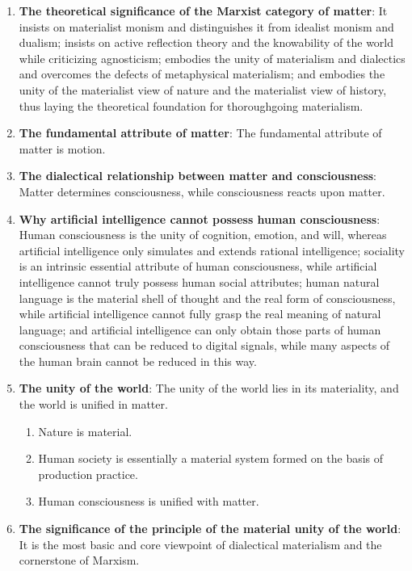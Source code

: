 \documentclass[12pt,a4paper]{ctexart}
\begin{document}
\begin{enumerate}[leftmargin=2em]
    \item \textbf{The theoretical significance of the Marxist category of matter}: It insists on materialist monism and distinguishes it from idealist monism and dualism; insists on active reflection theory and the knowability of the world while criticizing agnosticism; embodies the unity of materialism and dialectics and overcomes the defects of metaphysical materialism; and embodies the unity of the materialist view of nature and the materialist view of history, thus laying the theoretical foundation for thoroughgoing materialism.
    
    \item \textbf{The fundamental attribute of matter}: The fundamental attribute of matter is motion.
    
    \item \textbf{The dialectical relationship between matter and consciousness}: Matter determines consciousness, while consciousness reacts upon matter.
    
    \item \textbf{Why artificial intelligence cannot possess human consciousness}: Human consciousness is the unity of cognition, emotion, and will, whereas artificial intelligence only simulates and extends rational intelligence; sociality is an intrinsic essential attribute of human consciousness, while artificial intelligence cannot truly possess human social attributes; human natural language is the material shell of thought and the real form of consciousness, while artificial intelligence cannot fully grasp the real meaning of natural language; and artificial intelligence can only obtain those parts of human consciousness that can be reduced to digital signals, while many aspects of the human brain cannot be reduced in this way.
    
    \item \textbf{The unity of the world}: The unity of the world lies in its materiality, and the world is unified in matter.
    \begin{enumerate}[label=(\arabic*),leftmargin=2em]
        \item Nature is material.
        \item Human society is essentially a material system formed on the basis of production practice.
        \item Human consciousness is unified with matter.
    \end{enumerate}
    
    \item \textbf{The significance of the principle of the material unity of the world}: It is the most basic and core viewpoint of dialectical materialism and the cornerstone of Marxism.
\end{enumerate}
\end{document}
